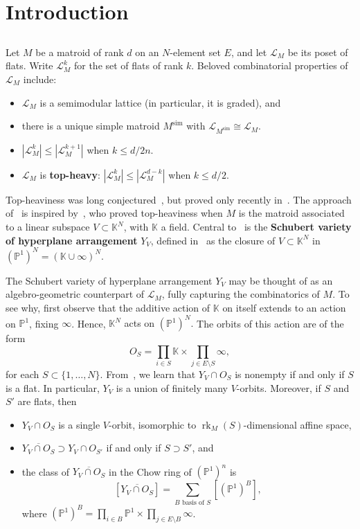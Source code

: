 \documentclass[11pt]{article}
\theoremstyle{definition}
\numberwithin{equation}{section}
\renewcommand{\P}{\mathbb{P}}
\newcommand{\simp}{\mathrm{sim}}
\newcommand{\K}{\mathbb{K}}
\DeclareMathOperator{\rk}{rk}
\newcommand{\word}[1]{\textbf{#1}}
\newcommand{\revision}[1]{{#1}}
\begin{document}
\newenvironment{claim}{\par\medskip\noindent\textit{Claim.}\space}{}

\section{Introduction}
\subsection{} Let $M$ be a matroid of rank $d$ on an $N$-element set $E$, and let $\mathcal L_M$ be its poset of flats. Write $\mathcal L_M^k$ for the set of flats of rank $k$.
Beloved combinatorial properties of~$\mathcal L_M$ include:
\begin{itemize}
\item $\mathcal L_M$ is a semimodular lattice (in particular, it is graded), and
\item there is a unique simple matroid $M^\simp$ with $\mathcal L_{M^\simp} \cong \mathcal L_M$.
\item $|\mathcal L_M^k| \leq |\mathcal L_M^{k+1}|$ when $k \leq d/2n$.
\item $\mathcal L_M$ is \word{top-heavy}: $|\mathcal L_M^k| \leq |\mathcal L_M^{d-k}|$ when $k \leq d/2$.
\end{itemize}
Top-heaviness was long conjectured~\cite{DW74, DW75}, but proved only recently in~\cite{BHMPW20b}.
The approach of~\cite{BHMPW20b} is inspired by~\cite{HW17}, who proved top-heaviness when $M$ is the matroid associated to a linear subspace $V \subset \K^N$, with $\K$ a field.
Central to~\cite{HW17} is the \word{Schubert variety of hyperplane arrangement} $Y_V$, defined in~\cite{AB16} as the closure of $V \subset \K^N$ in $(\P^1)^N = (\K \cup \infty)^N$.

The Schubert variety of hyperplane arrangement $Y_V$ may be thought of as an algebro-geometric counterpart of $\mathcal L_M$, fully capturing the combinatorics of $M$.
To see why, first observe that the additive action of $\K$ \revision{on itself} extends to an action on $\P^1$, fixing $\infty$.
Hence, \revision{$\K^N$ acts on $(\P^1)^N$.}
The orbits of this action are of the form
\[ \textstyle
  O_S = \prod_{i \in S} \K \times \prod_{j \in E \setminus S} \infty,
\]
for each $S \subset \{1, \ldots, N\}$.
From~\cite{AB16,HW17}, we learn that $Y_V \cap O_S$ is nonempty if and only if $S$ is a flat. In particular, $Y_V$ is a union of finitely many $V$-orbits. Moreover, if $S$ and $S'$ are flats, then
\begin{itemize}
\item  $Y_V \cap O_S$ is a single $V$-orbit, isomorphic to $\rk_M(S)$-dimensional affine space,
\item  $\overline{Y_V \cap O_S} \supset Y_{V} \cap O_{S'}$ if and only if $S \supset S'$, and
\item the class of $\overline{Y_V \cap O_S}$ in the Chow ring of $(\P^1)^n$ is
  \[
    [\overline{Y_V \cap O_S}] = \sum_{B \text{ basis of $S$}} {\textstyle [(\P^1)^B],}
  \]
  where $(\P^1)^B = \prod_{i \in B} \P^1 \times \prod_{j \in E \setminus B} \infty$.
\end{itemize}  
\end{document}

